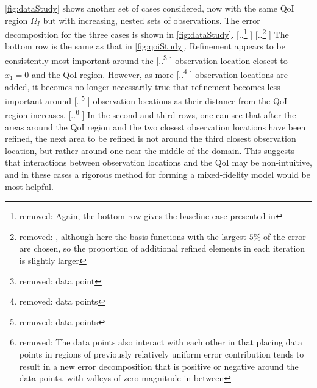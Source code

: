 \documentclass[review]{siamart0516}
\providecommand{\DIFaddtex}[1]{{\protect\color{blue} \sf #1}} %
\providecommand{\DIFdeltex}[1]{{\protect\color{red} [..\footnote{removed: #1} ]}} %
\providecommand{\DIFaddbegin}{} %
\providecommand{\DIFaddend}{} %
\providecommand{\DIFdelbegin}{} %
\providecommand{\DIFdelend}{} %
\providecommand{\DIFadd}[1]{\texorpdfstring{\DIFaddtex{#1}}{#1}} %
\providecommand{\DIFdel}[1]{\texorpdfstring{\DIFdeltex{#1}}{}} %
\newcommand{\DIFscaledelfig}{0.5}
\newlength{\DIFdelgraphicswidth} %
\newlength{\DIFdelgraphicsheight} %
\newcommand{\DIFaddincludegraphics}[2][]{{\color{blue}\fbox{\DIFOincludegraphics[#1]{#2}}}} %
\newcommand{\DIFdelincludegraphics}[2][]{%
\sbox{\DIFdelgraphicsbox}{\DIFOincludegraphics[#1]{#2}}%
\settoboxwidth{\DIFdelgraphicswidth}{\DIFdelgraphicsbox} %
\settoboxtotalheight{\DIFdelgraphicsheight}{\DIFdelgraphicsbox} %
\scalebox{\DIFscaledelfig}{%
\parbox[b]{\DIFdelgraphicswidth}{\usebox{\DIFdelgraphicsbox}\\[-\baselineskip] \rule{\DIFdelgraphicswidth}{0em}}\llap{\resizebox{\DIFdelgraphicswidth}{\DIFdelgraphicsheight}{%
\setlength{\unitlength}{\DIFdelgraphicswidth}%
\begin{picture}(1,1)%
\thicklines\linethickness{2pt} %
{\color[rgb]{1,0,0}\put(0,0){\framebox(1,1){}}}%
{\color[rgb]{1,0,0}\put(0,0){\line( 1,1){1}}}%
{\color[rgb]{1,0,0}\put(0,1){\line(1,-1){1}}}%
\end{picture}%
}\hspace*{3pt}}} %
} %
\DeclareRobustCommand{\DIFaddbegin}{\DIFOaddbegin \let\includegraphics\DIFaddincludegraphics} %
\DeclareRobustCommand{\DIFaddend}{\DIFOaddend \let\includegraphics\DIFOincludegraphics} %
\DeclareRobustCommand{\DIFdelbegin}{\DIFOdelbegin \let\includegraphics\DIFdelincludegraphics} %
\DeclareRobustCommand{\DIFdelend}{\DIFOaddend \let\includegraphics\DIFOincludegraphics} %
\begin{document}
\cref{fig:dataStudy} shows another set of cases considered, now with the same QoI region $\Omega_I$ but with increasing, nested sets of observations.
The error decomposition for the three cases is shown in \cref{fig:dataStudy}. \DIFdelbegin \DIFdel{Again, the bottom row gives the baseline case presented in }%
\DIFdel{, although here the basis functions with the largest $5\%$ of the error are chosen, so the proportion of additional refined elements in each iteration is slightly larger}\DIFdelend \DIFaddbegin \DIFadd{The bottom row is the same as that in }\cref{fig:qoiStudy}\DIFaddend . Refinement appears to be consistently most important around the \DIFdelbegin \DIFdel{data point }\DIFdelend \DIFaddbegin \DIFadd{observation location }\DIFaddend closest to $x_1=0$ and the QoI region. However, as more \DIFdelbegin \DIFdel{data points }\DIFdelend \DIFaddbegin \DIFadd{observation locations }\DIFaddend are added, it becomes no longer necessarily true that refinement becomes less important around \DIFdelbegin \DIFdel{data points }\DIFdelend \DIFaddbegin \DIFadd{observation locations }\DIFaddend as their distance from the QoI region increases. \DIFdelbegin \DIFdel{The data points also interact with each other in that placing data points in regions of previously relatively uniform error contribution tends to result in a new error decomposition that is positive or negative around the data points, with valleys of zero magnitude in between }\DIFdelend \DIFaddbegin \DIFadd{In the second and third rows, one can see that after the areas around the QoI region and the two closest observation locations have been refined, the next area to be refined is not around the third closest observation location, but rather around one near the middle of the domain. This suggests that interactions between observation locations and the QoI may be non-intuitive, and in these cases a rigorous method for forming a mixed-fidelity model would be most helpful}\DIFaddend . %
\end{document}
